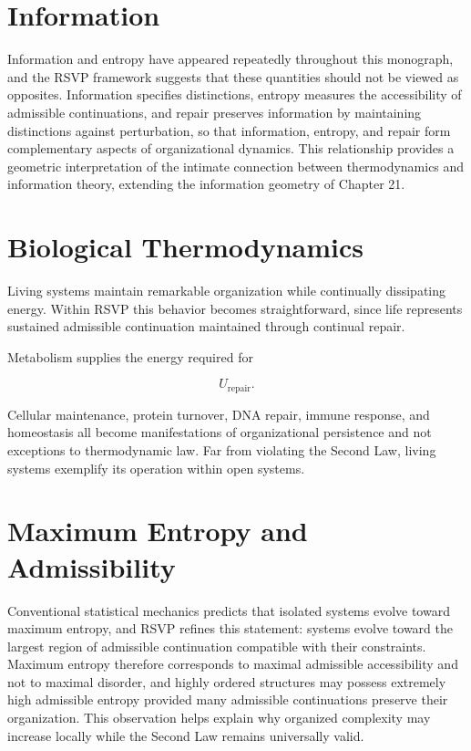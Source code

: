 \documentclass[11pt,oneside]{book}
\numberwithin{equation}{chapter}
\theoremstyle{definition}
\theoremstyle{plain}
\begin{document}
\section{Information}

Information and entropy have appeared repeatedly throughout this monograph, and the RSVP framework suggests that these quantities should not be viewed as opposites. Information specifies distinctions, entropy measures the accessibility of admissible continuations, and repair preserves information by maintaining distinctions against perturbation, so that information, entropy, and repair form complementary aspects of organizational dynamics. This relationship provides a geometric interpretation of the intimate connection between thermodynamics and information theory, extending the information geometry of Chapter 21.

\section{Biological Thermodynamics}

Living systems maintain remarkable organization while continually dissipating energy. Within RSVP this behavior becomes straightforward, since life represents sustained admissible continuation maintained through continual repair.

Metabolism supplies the energy required for

\[
U_{\mathrm{repair}}.
\]

Cellular maintenance, protein turnover, DNA repair, immune response, and homeostasis all become manifestations of organizational persistence and not exceptions to thermodynamic law. Far from violating the Second Law, living systems exemplify its operation within open systems.

\section{Maximum Entropy and Admissibility}

Conventional statistical mechanics predicts that isolated systems evolve toward maximum entropy, and RSVP refines this statement: systems evolve toward the largest region of admissible continuation compatible with their constraints. Maximum entropy therefore corresponds to maximal admissible accessibility and not to maximal disorder, and highly ordered structures may possess extremely high admissible entropy provided many admissible continuations preserve their organization. This observation helps explain why organized complexity may increase locally while the Second Law remains universally valid.
\end{document}
